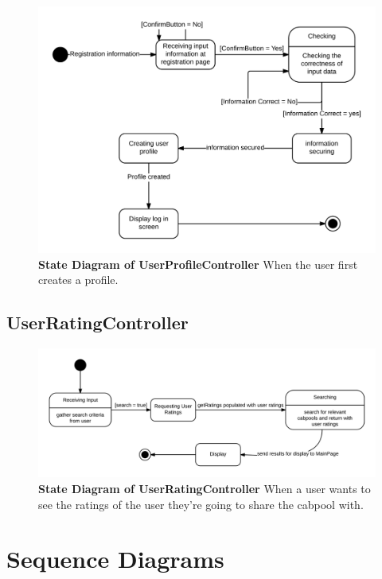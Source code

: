 \documentclass[]{article}
\begin{document}
\begin{figure}[H]
\label{UPCState}
	\centering
	\includegraphics[width=1\textwidth]{UserProfileController.png}
	\caption{\textbf{State Diagram of UserProfileController} When the user first creates a profile.}
\end{figure}

\subsection{UserRatingController}

\begin{figure}[H]
\label{URCState}
	\centering
	\includegraphics[width=1\textwidth]{UserRatingController.png}
	\caption{\textbf{State Diagram of UserRatingController} When a user wants to see the ratings of the user they're going to share the cabpool with.}
\end{figure}


\section{Sequence Diagrams}
\label{SeqDi}
\end{document}
